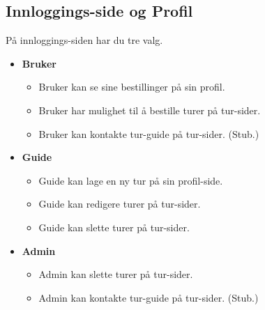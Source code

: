\documentclass[../doc]{subfiles}
\begin{document}
\subsection{Innloggings-side og Profil}
På innloggings-siden har du tre valg. 
\begin{itemize}
    \item \textbf{Bruker}
    \begin{itemize}
        \item Bruker kan se sine bestillinger på sin profil.
        \item Bruker har mulighet til å bestille turer på tur-sider.
        \item Bruker kan kontakte tur-guide på tur-sider. (Stub.)
    \end{itemize}
    \item \textbf{Guide}
    \begin{itemize}
        \item Guide kan lage en ny tur på sin profil-side.
        \item Guide kan redigere turer på tur-sider.
        \item Guide kan slette turer på tur-sider.
    \end{itemize}
    \item \textbf{Admin}
    \begin{itemize}
        \item Admin kan slette turer på tur-sider.
        \item Admin kan kontakte tur-guide på tur-sider. (Stub.)
    \end{itemize}
\end{itemize}
\end{document}
